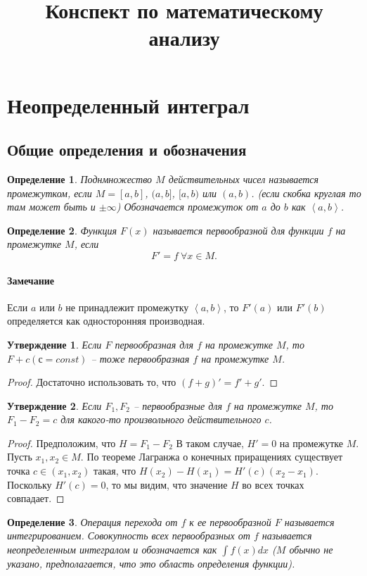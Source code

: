 \documentclass{article}
\theoremstyle{plain}
\newtheorem{claim}{Утверждение}
\newtheorem{definition}{Определение}
\theoremstyle{definition}
\theoremstyle{remark}
\renewcommand{\*}{\cdot}
\begin{document}
\title{Конспект по математическому анализу}
\date{}
\maketitle

\tableofcontents

\newpage
\section{Неопределенный интеграл}
\subsection{Общие определения и обозначения}
\begin{definition} Поднмножество $M$ действительных чисел называется промежутком, если $M = [a, b]$, $(a, b]$, $[a, b)$ или $(a, b)$. (если скобка круглая то там может быть и $\pm\infty$) Обозначается промежуток от $a$ до $b$ как $\left<a, b\right>$. 
\end{definition}
\begin{definition} Функция $F(x)$ называется первообразной для функции $f$ на промежутке $M$, если \[F'= f ~ \forall x \in M.\]
\end{definition}
\paragraph{Замечание} Если $a$ или $b$ не принадлежит промежутку $\left<a, b\right>$, то $F'(a)$ или $F'(b)$ определяется как односторонняя производная.

\begin{claim} Если $F$ первообразная для $f$ на промежутке $M$, то $F + c (с = const)$ -- тоже первообразная $f$ на промежутке $M$. 
\end{claim}
\begin{proof} Достаточно использовать то, что $(f+g)' = f' + g'.$ 
\end{proof}
\begin{claim}
Если $F_1, F_2$ -- первообразные для $f$ на промежутке $M$, то $F_1 - F_2 = c$ для какого-то произвольного действительного $c$. 
\end{claim}
\begin{proof} Предположим, что $H = F_1 - F_2$ В таком случае, $H' = 0$ на промежутке $M$. Пусть $x_1, x_2 \in M.$ По теореме Лагранжа о конечных приращениях существует точка $c \in (x_1, x_2)$ такая, что $H(x_2) - H(x_1) = H'(c)(x_2 - x_1).$ Поскольку $H'(c) = 0$, то мы видим, что значение $H$ во всех точках совпадает.
\end{proof}
\begin{definition} Операция перехода от $f$ к ее первообразной $F$ называется интегрированием. Совокупность всех первообразных от $f$ называется неопределенным интегралом и обозначается как $\int f(x)dx$ ($M$ обычно не указано, предполагается, что это область определения функции).
\end{definition}
\end{document}

